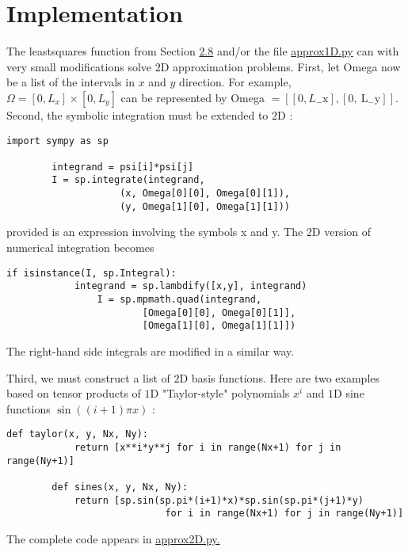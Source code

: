 \documentclass[../main.tex]{subfiles}
\begin{document}
	\section[Implementation]{Implementation}
	\label{sec:sec_8_3}
	\noindent The least\textunderscore squares function from Section \hyperref[sec:sec_2_8]{2.8} and/or the file \href{https://github.com/hplgit/INF5620/blob/master/src/fem/fe_approx1D.py}{approx1D.py} can with very small modifications solve $2 \mathrm{D}$ approximation problems. First, let Omega now be a list of the intervals in $x$ and $y$ direction. For example, $\Omega=\left[0, L_{x}\right] \times\left[0, L_{y}\right]$ can be represented by Omega $=\left[\left[0, L_{-} \mathrm{x}\right],\left[0, \mathrm{~L}_{-} \mathrm{y}\right]\right]$. Second, the symbolic integration must be extended to $2 \mathrm{D}$ :
	\begin{lstlisting}[numbers=none]
		import sympy as sp
	
		integrand = psi[i]*psi[j]
		I = sp.integrate(integrand,
					(x, Omega[0][0], Omega[0][1]),
					(y, Omega[1][0], Omega[1][1]))	
	\end{lstlisting}
	provided  is an expression involving the  symbols x and y. The
	2D version of numerical integration becomes
	\begin{lstlisting}[numbers=none]
		if isinstance(I, sp.Integral):
			integrand = sp.lambdify([x,y], integrand)
				I = sp.mpmath.quad(integrand,
						[Omega[0][0], Omega[0][1]],
						[Omega[1][0], Omega[1][1]])	
	\end{lstlisting}
	The right-hand side integrals are modified in a similar way.
	
	Third, we must construct a list of $2 \mathrm{D}$ basis functions. Here are two examples based on tensor products of $1 \mathrm{D}$ "Taylor-style" polynomials $x^{i}$ and $1 \mathrm{D}$ sine functions $\sin ((i+1) \pi x)$ :
	\begin{lstlisting}[numbers=none]
		def taylor(x, y, Nx, Ny):
			return [x**i*y**j for i in range(Nx+1) for j in range(Ny+1)]
		
		def sines(x, y, Nx, Ny):
			return [sp.sin(sp.pi*(i+1)*x)*sp.sin(sp.pi*(j+1)*y)
							for i in range(Nx+1) for j in range(Ny+1)]	
	\end{lstlisting}
	The complete code appears in \href{http://tinyurl.com/jvzzcfn/fem/fe_approx2D.py}{approx2D.py.}
	
\end{document}

